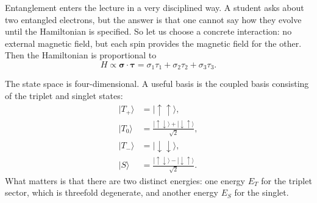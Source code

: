 Entanglement enters the lecture in a very disciplined way. A student asks about two entangled electrons, but the answer is that one cannot say how they evolve until the Hamiltonian is specified. So let us choose a concrete interaction: no external magnetic field, but each spin provides the magnetic field for the other. Then the Hamiltonian is proportional to
\begin{equation}
H \propto \boldsymbol{\sigma}\cdot\boldsymbol{\tau}
=
\sigma_1\tau_1+\sigma_2\tau_2+\sigma_3\tau_3.
\end{equation}

The state space is four-dimensional. A useful basis is the coupled basis consisting of the triplet and singlet states:
\begin{align}
|T_+\rangle &= |\uparrow\uparrow\rangle, \\
|T_0\rangle &= \frac{|\uparrow\downarrow\rangle+|\downarrow\uparrow\rangle}{\sqrt2}, \\
|T_-\rangle &= |\downarrow\downarrow\rangle, \\
|S\rangle &= \frac{|\uparrow\downarrow\rangle-|\downarrow\uparrow\rangle}{\sqrt2}.
\end{align}
What matters is that there are two distinct energies: one energy \(E_T\) for the triplet sector, which is threefold degenerate, and another energy \(E_S\) for the singlet.

